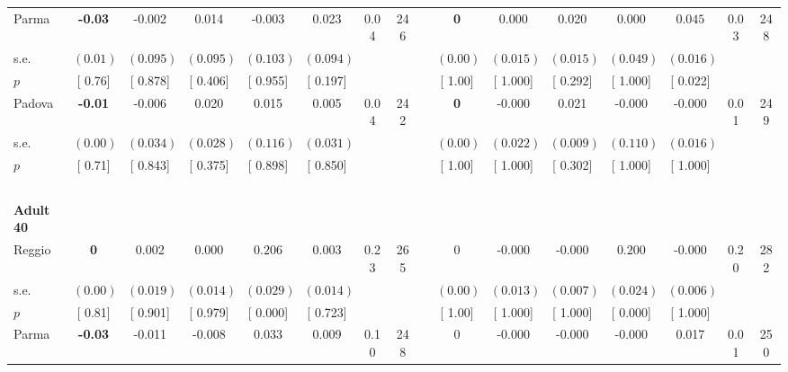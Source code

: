 \begin{longtable}{L{8em} c c c c c c c p{1em} c c c c c c c}
\quad \quad \quad Parma& \textbf{    -0.03} &    -0.002 &     0.014 &    -0.003 &     0.023 &      0.04 &       246 & & \textbf{0} &     0.000 &     0.020 &     0.000 & $ \mathbf{    0.045}$ &      0.03 &       248  \\*
\quad \quad \quad \quad s.e.& $ (     0.01)$ & $ (    0.095)$ & $ (    0.095)$ & $ (    0.103)$ & $ (    0.094)$ & & & & $ (     0.00)$ & $ (    0.015)$ & $ (    0.015)$ & $ (    0.049)$ & $ (    0.016)$ & &  \\*
\quad \quad \quad \quad $ p$ & [     0.76] & [    0.878] & [    0.406] & [    0.955] & [    0.197] & & & & [     1.00] & [    1.000] & [    0.292] & [    1.000] & [    0.022] & &  \\[1em]
\quad \quad \quad Padova& \textbf{    -0.01} &    -0.006 &     0.020 &     0.015 &     0.005 &      0.04 &       242 & & \textbf{0} &    -0.000 &     0.021 &    -0.000 &    -0.000 &      0.01 &       249  \\*
\quad \quad \quad \quad s.e.& $ (     0.00)$ & $ (    0.034)$ & $ (    0.028)$ & $ (    0.116)$ & $ (    0.031)$ & & & & $ (     0.00)$ & $ (    0.022)$ & $ (    0.009)$ & $ (    0.110)$ & $ (    0.016)$ & &  \\*
\quad \quad \quad \quad $ p$ & [     0.71] & [    0.843] & [    0.375] & [    0.898] & [    0.850] & & & & [     1.00] & [    1.000] & [    0.302] & [    1.000] & [    1.000] & &  \\[1em]
~\\[1em]
\quad \quad \textbf{Adult 40} & & & & & & & & & & & & & & & \\* 
\quad \quad \quad Reggio& \textbf{0} &     0.002 &     0.000 & $ \mathbf{    0.206}$ &     0.003 &      0.23 &       265 & & 0 &    -0.000 &    -0.000 & $ \mathbf{    0.200}$ &    -0.000 &      0.20 &       282  \\*
\quad \quad \quad \quad s.e.& $ (     0.00)$ & $ (    0.019)$ & $ (    0.014)$ & $ (    0.029)$ & $ (    0.014)$ & & & & $ (     0.00)$ & $ (    0.013)$ & $ (    0.007)$ & $ (    0.024)$ & $ (    0.006)$ & &  \\*
\quad \quad \quad \quad $ p$ & [     0.81] & [    0.901] & [    0.979] & [    0.000] & [    0.723] & & & & [     1.00] & [    1.000] & [    1.000] & [    0.000] & [    1.000] & &  \\[1em]
\quad \quad \quad Parma& \textbf{    -0.03} &    -0.011 &    -0.008 &     0.033 &     0.009 &      0.10 &       248 & & 0 &    -0.000 &    -0.000 &    -0.000 &     0.017 &      0.01 &       250  \\*

\end{longtable}
